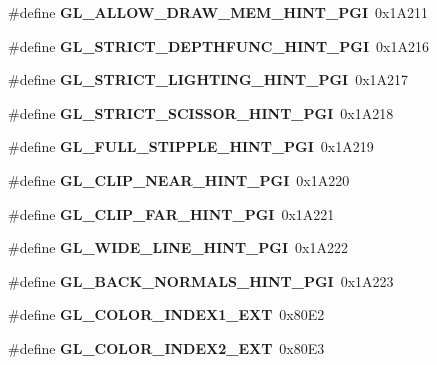 \begin{DoxyCompactItemize}
\item 
\#define {\bfseries G\+L\+\_\+\+A\+L\+L\+O\+W\+\_\+\+D\+R\+A\+W\+\_\+\+M\+E\+M\+\_\+\+H\+I\+N\+T\+\_\+\+P\+G\+I}~0x1\+A211\label{_s_d_l__opengl_8h_a782d0a7224f28fa84ce82ee3351918bc}

\item 
\#define {\bfseries G\+L\+\_\+\+S\+T\+R\+I\+C\+T\+\_\+\+D\+E\+P\+T\+H\+F\+U\+N\+C\+\_\+\+H\+I\+N\+T\+\_\+\+P\+G\+I}~0x1\+A216\label{_s_d_l__opengl_8h_a9530b2e1a16f77c65216b53be88edb89}

\item 
\#define {\bfseries G\+L\+\_\+\+S\+T\+R\+I\+C\+T\+\_\+\+L\+I\+G\+H\+T\+I\+N\+G\+\_\+\+H\+I\+N\+T\+\_\+\+P\+G\+I}~0x1\+A217\label{_s_d_l__opengl_8h_a22efb1f7fcf5c4b2e563669a90e8192a}

\item 
\#define {\bfseries G\+L\+\_\+\+S\+T\+R\+I\+C\+T\+\_\+\+S\+C\+I\+S\+S\+O\+R\+\_\+\+H\+I\+N\+T\+\_\+\+P\+G\+I}~0x1\+A218\label{_s_d_l__opengl_8h_a37d1da13a1bd5e56a5984d0b9b980f37}

\item 
\#define {\bfseries G\+L\+\_\+\+F\+U\+L\+L\+\_\+\+S\+T\+I\+P\+P\+L\+E\+\_\+\+H\+I\+N\+T\+\_\+\+P\+G\+I}~0x1\+A219\label{_s_d_l__opengl_8h_a25b38ba1148499c93c6c1b8e407a5aac}

\item 
\#define {\bfseries G\+L\+\_\+\+C\+L\+I\+P\+\_\+\+N\+E\+A\+R\+\_\+\+H\+I\+N\+T\+\_\+\+P\+G\+I}~0x1\+A220\label{_s_d_l__opengl_8h_a76fcdd2112193113835419ef9e00c5aa}

\item 
\#define {\bfseries G\+L\+\_\+\+C\+L\+I\+P\+\_\+\+F\+A\+R\+\_\+\+H\+I\+N\+T\+\_\+\+P\+G\+I}~0x1\+A221\label{_s_d_l__opengl_8h_ad2bc33507c7fd107375361565521196b}

\item 
\#define {\bfseries G\+L\+\_\+\+W\+I\+D\+E\+\_\+\+L\+I\+N\+E\+\_\+\+H\+I\+N\+T\+\_\+\+P\+G\+I}~0x1\+A222\label{_s_d_l__opengl_8h_a91e48582a3c3d587b9904e1b44b37afd}

\item 
\#define {\bfseries G\+L\+\_\+\+B\+A\+C\+K\+\_\+\+N\+O\+R\+M\+A\+L\+S\+\_\+\+H\+I\+N\+T\+\_\+\+P\+G\+I}~0x1\+A223\label{_s_d_l__opengl_8h_a416ff27f4b8f56021e43bbc2f07d0fb3}

\item 
\#define {\bfseries G\+L\+\_\+\+C\+O\+L\+O\+R\+\_\+\+I\+N\+D\+E\+X1\+\_\+\+E\+X\+T}~0x80\+E2\label{_s_d_l__opengl_8h_a543a2054de613839eae3518ae474fbe4}

\item 
\#define {\bfseries G\+L\+\_\+\+C\+O\+L\+O\+R\+\_\+\+I\+N\+D\+E\+X2\+\_\+\+E\+X\+T}~0x80\+E3\label{_s_d_l__opengl_8h_aa2227a85a34c9ffbb44bec566c5ff65e}


\end{DoxyCompactItemize}
